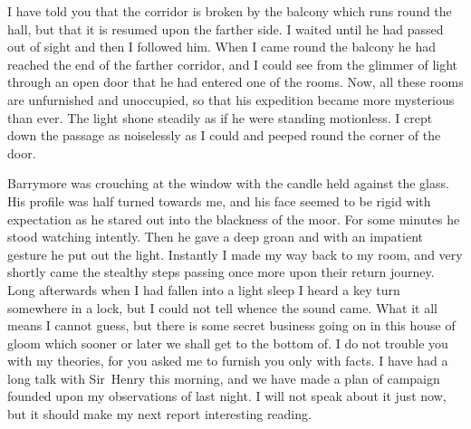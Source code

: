 I have told you that the corridor is broken by the balcony which runs round the hall, but that it is resumed upon the farther side. I waited until he had passed out of sight and then I followed him. When I came round the balcony he had reached the end of the farther corridor, and I could see from the glimmer of light through an open door that he had entered one of the rooms. Now, all these rooms are unfurnished and unoccupied, so that his expedition became more mysterious than ever. The light shone steadily as if he were standing motionless. I crept down the passage as noiselessly as I could and peeped round the corner of the door.

Barrymore was crouching at the window with the candle held against the glass. His profile was half turned towards me, and his face seemed to be rigid with expectation as he stared out into the blackness of the moor. For some minutes he stood watching intently. Then he gave a deep groan and with an impatient gesture he put out the light. Instantly I made my way back to my room, and very shortly came the stealthy steps passing once more upon their return journey. Long afterwards when I had fallen into a light sleep I heard a key turn somewhere in a lock, but I could not tell whence the sound came. What it all means I cannot guess, but there is some secret business going on in this house of gloom which sooner or later we shall get to the bottom of. I do not trouble you with my theories, for you asked me to furnish you only with facts. I have had a long talk with Sir~Henry this morning, and we have made a plan of campaign founded upon my observations of last night. I will not speak about it just now, but it should make my next report interesting reading.

